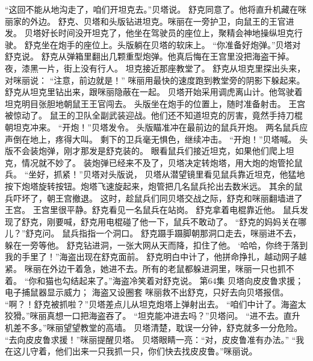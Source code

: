 \documentclass[a4paper,12pt,UTF8,twoside]{ctexbook}
\begin{document}
        “这回不能从地沟走了，咱们开坦克去。”贝塔说。 
        舒克同意了。他将直升机藏在咪丽家的外边。 
        舒克、贝塔和头版钻进坦克。咪丽在一旁护卫，向鼠王的王官进发。 
        贝塔好长时间没开坦克了，他坐在驾驶员的座位上，聚精会神地操纵坦克行驶。 
        舒克坐在炮手的座位上。头版躺在贝塔的软床上。 
        “你准备好炮弹。”贝塔对舒克说。 
        舒克从弹箱里翻出几颗重型炮弹。他真后悔在王宫里没把海盗干掉。 
        夜，漆黑一片，街上没有行人。 
        坦克接近那座教堂了。 
        舒克从坦克里探出头来，对咪丽说： 
        “注意，前边就是！” 
        咪丽用最快的速度跑到教堂旁的阴影下躲起来。 
        舒克从坦克里钻出来，跟咪丽隐蔽在一起。 
        贝塔开始采用调虎离山计。他驾驶着坦克明目张胆地朝鼠王王官闯去。 
        头版坐在炮手的位置上，随时准备射击。 
        王宫被惊动了。 
        鼠王的卫队全副武装迎战。他们还不知道坦克的厉害，竟然手持刀棍朝坦克冲来。 
        “开炮！”贝塔发令。 
        头版瞄准冲在最前边的鼠兵开炮。 
        两名鼠兵应声倒在地上，疼得大叫。 
        剩下的卫兵毫无惧色，继续冲击。 
        “开炮！”贝塔喊。 
        头版不会装炮弹，刚才那发是舒克装的。 
        眼看鼠兵们接近坦克，如果他们爬上坦克，情况就不妙了。 
        装炮弹已经来不及了，贝塔决定转炮塔，用大炮的炮管抡鼠兵。 
        “坐好，抓紧！”贝塔对头版说， 
        贝塔从潜望镜里看见鼠兵靠近坦克，他猛地按下炮塔旋转按钮。炮塔飞速旋起来，炮管把几名鼠兵抡出去数米远。 
        其余的鼠兵吓坏了，朝王宫撤退。 
        这时，趁鼠兵们同贝塔交战之际，舒克和咪丽翻墙进了王宫。 
        王宫里很平静。舒克看见一名鼠兵在站岗。 
        舒克拿着电棍靠近他。 
        鼠兵发现了舒克，刚要喊，舒克用电棍碰了他一下，鼠兵不敢动了。 
        “舒克的妈妈关在哪儿？”舒克问。 
        鼠兵指指一个洞口。 
        舒克蹑手蹑脚朝那洞口走去，咪丽进不去，躲在一旁等他。 
        舒克钻进洞，一张大网从天而降，扣住了他。 
        ‘哈哈，你终于落到我的手里了！”海盗出现在舒克面前。 
        舒克明白中计了，他拼命挣扎，越动网子越紧。 
        咪丽在外边干着急，她进不去。所有的老鼠都躲进洞里，咪丽一只也抓不着。 
        “你和猫也勾结起来了。”海盗冷笑着对舒克说。   第64集 
        贝塔向皮皮鲁求援； 
        电子捕鼠器显示威力； 
        海盗又设圈套   
        咪丽救不出舒克，只好去向贝塔报信。 
        “啊？！舒克被抓啦？”贝塔差点儿从坦克炮塔上弹射出去。 
        “咱们中计了。海盗太狡猾。”咪丽真想一口把海盗吞了。 
        “坦克能冲进去吗？”贝塔问。 
        “进不去。直升机差不多。”咪丽望望教堂的高墙。 
        贝塔清楚，耽误一分钟，舒克就多一分危险。 
        “去向皮皮鲁求援！”咪丽提醒贝塔。 
        贝塔眼睛一亮：“对，皮皮鲁准有办法。” 
        “我在这儿守着，他们出来一只我抓一只，你们快去找皮皮鲁。”咪丽说。 
\end{document}
